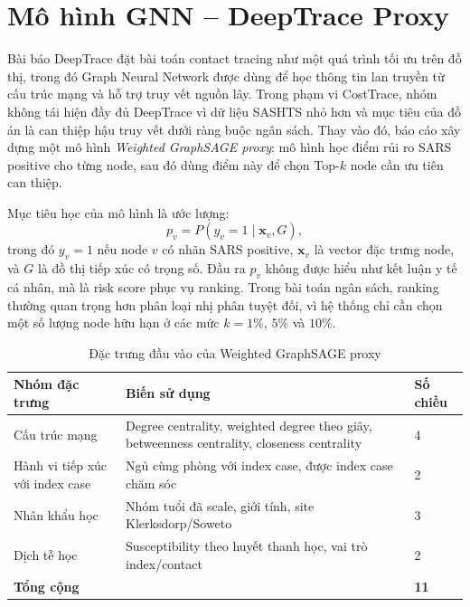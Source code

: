 \documentclass[12pt,a4paper]{report}
\theoremstyle{definition}
\begin{document}
\section{Mô hình GNN -- DeepTrace Proxy}
\label{sec:gnn_deeptrace_proxy}

Bài báo DeepTrace đặt bài toán contact tracing như một quá trình tối ưu trên đồ thị, trong đó Graph Neural Network được dùng để học thông tin lan truyền từ cấu trúc mạng và hỗ trợ truy vết nguồn lây. Trong phạm vi CostTrace, nhóm không tái hiện đầy đủ DeepTrace vì dữ liệu SASHTS nhỏ hơn và mục tiêu của đồ án là can thiệp hậu truy vết dưới ràng buộc ngân sách. Thay vào đó, báo cáo xây dựng một mô hình \textit{Weighted GraphSAGE proxy}: mô hình học điểm rủi ro SARS positive cho từng node, sau đó dùng điểm này để chọn Top-$k$ node cần ưu tiên can thiệp.

Mục tiêu học của mô hình là ước lượng:
\[
  p_v = P(y_v = 1 \mid \mathbf{x}_v, G),
\]
trong đó $y_v=1$ nếu node $v$ có nhãn SARS positive, $\mathbf{x}_v$ là vector đặc trưng node, và $G$ là đồ thị tiếp xúc có trọng số. Đầu ra $p_v$ không được hiểu như kết luận y tế cá nhân, mà là risk score phục vụ ranking. Trong bài toán ngân sách, ranking thường quan trọng hơn phân loại nhị phân tuyệt đối, vì hệ thống chỉ cần chọn một số lượng node hữu hạn ở các mức $k=1\%$, $5\%$ và $10\%$.

\begin{table}[H]
\centering
\caption{Đặc trưng đầu vào của Weighted GraphSAGE proxy}
\label{tab:gnn_features}
\begin{tabularx}{\textwidth}{L{4.4cm} Y C{2.2cm}}
\toprule
\textbf{Nhóm đặc trưng} & \textbf{Biến sử dụng} & \textbf{Số chiều}\\
\midrule
Cấu trúc mạng & Degree centrality, weighted degree theo giây, betweenness centrality, closeness centrality & 4\\
Hành vi tiếp xúc với index case & Ngủ cùng phòng với index case, được index case chăm sóc & 2\\
Nhân khẩu học & Nhóm tuổi đã scale, giới tính, site Klerksdorp/Soweto & 3\\
Dịch tễ học & Susceptibility theo huyết thanh học, vai trò index/contact & 2\\
\midrule
\textbf{Tổng cộng} & & \textbf{11}\\
\bottomrule
\end{tabularx}
\end{table}
\end{document}
